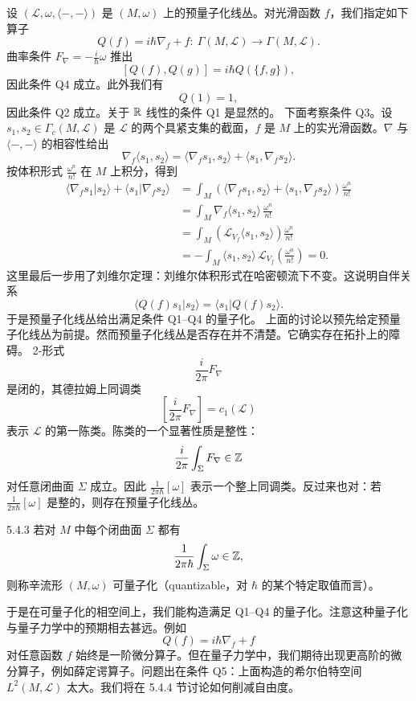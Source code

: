 设 $(\mathcal{L},\omega,\langle-,-\rangle)$ 是 $(M,\omega)$ 上的预量子化线丛。对光滑函数 $f$，我们指定如下算子
\[
Q(f)=i\hbar\nabla_f+f:\
\Gamma(M,\mathcal{L})\longrightarrow\Gamma(M,\mathcal{L}).
\]
曲率条件 $F_\nabla=-\frac{i}{\hbar}\omega$ 推出
\[
[Q(f),Q(g)]=i\hbar Q(\{f,g\}),
\]
因此条件 Q4 成立。此外我们有
\[
Q(1)=1,
\]
因此条件 Q2 成立。关于 $\mathbb{R}$ 线性的条件 Q1 是显然的。
下面考察条件 Q3。设 $s_1,s_2\in\Gamma_c(M,\mathcal{L})$ 是 $\mathcal{L}$ 的两个具紧支集的截面，$f$ 是 $M$ 上的实光滑函数。$\nabla$ 与 $\langle-,-\rangle$ 的相容性给出
\[
\nabla_f\langle s_1,s_2\rangle
=\langle\nabla_fs_1,s_2\rangle+\langle s_1,\nabla_fs_2\rangle.
\]
按体积形式 $\frac{\omega^n}{n!}$ 在 $M$ 上积分，得到
\[
\begin{aligned}
\langle\nabla_fs_1|s_2\rangle+\langle s_1|\nabla_fs_2\rangle
&=\int_M\left(\langle\nabla_fs_1,s_2\rangle+\langle s_1,\nabla_fs_2\rangle\right)
\frac{\omega^n}{n!}\\
&=\int_M\nabla_f\langle s_1,s_2\rangle\,\frac{\omega^n}{n!}\\
&=\int_M\left(\mathscr{L}_{V_f}\langle s_1,s_2\rangle\right)
\frac{\omega^n}{n!}\\
&=-\int_M\langle s_1,s_2\rangle\,
\mathscr{L}_{V_f}\left(\frac{\omega^n}{n!}\right)=0.
\end{aligned}
\]
这里最后一步用了刘维尔定理：刘维尔体积形式在哈密顿流下不变。这说明自伴关系
\[
\langle Q(f)s_1|s_2\rangle=\langle s_1|Q(f)s_2\rangle.
\]
于是预量子化线丛给出满足条件 Q1–Q4 的量子化。
上面的讨论以预先给定预量子化线丛为前提。然而预量子化线丛是否存在并不清楚。它确实存在拓扑上的障碍。
2-形式
\[
\frac{i}{2\pi}F_\nabla
\]
是闭的，其德拉姆上同调类
\[
\left[\frac{i}{2\pi}F_\nabla\right]=c_1(\mathcal{L})
\]
表示 $\mathcal{L}$ 的第一陈类。陈类的一个显著性质是整性：
\[
\frac{i}{2\pi}\int_\Sigma F_\nabla\in\mathbb{Z}
\]
对任意闭曲面 $\Sigma$ 成立。因此 $\frac{1}{2\pi\hbar}[\omega]$ 表示一个整上同调类。反过来也对：若 $\frac{1}{2\pi\hbar}[\omega]$ 是整的，则存在预量子化线丛。

\begin{definition}{5.4.3}
  若对 $M$ 中每个闭曲面 $\Sigma$ 都有
  \[
  \frac{1}{2\pi\hbar}\int_\Sigma\omega\in\mathbb{Z},
  \]
  则称辛流形 $(M,\omega)$ 可量子化（quantizable，对 $\hbar$ 的某个特定取值而言）。
\end{definition}

于是在可量子化的相空间上，我们能构造满足 Q1–Q4 的量子化。注意这种量子化与量子力学中的预期相去甚远。例如
\[
Q(f)=i\hbar\nabla_f+f
\]
对任意函数 $f$ 始终是一阶微分算子。但在量子力学中，我们期待出现更高阶的微分算子，例如薛定谔算子。问题出在条件 Q5：上面构造的希尔伯特空间 $L^2(M,\mathcal{L})$ 太大。我们将在 5.4.4 节讨论如何削减自由度。

